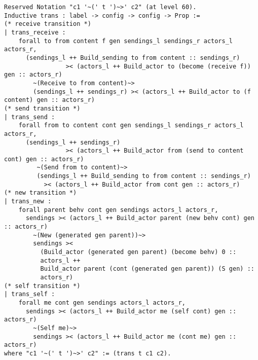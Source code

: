 \begin{lstlisting}
Reserved Notation "c1 '~(' t ')~>' c2" (at level 60).
Inductive trans : label -> config -> config -> Prop :=
(* receive transition *)
| trans_receive :
    forall to from content f gen sendings_l sendings_r actors_l actors_r,
      (sendings_l ++ Build_sending to from content :: sendings_r)
                 >< (actors_l ++ Build_actor to (become (receive f)) gen :: actors_r)
        ~(Receive to from content)~>
        (sendings_l ++ sendings_r) >< (actors_l ++ Build_actor to (f content) gen :: actors_r)
(* send transition *)
| trans_send :
    forall from to content cont gen sendings_l sendings_r actors_l actors_r,
      (sendings_l ++ sendings_r)
                 >< (actors_l ++ Build_actor from (send to content cont) gen :: actors_r)
         ~(Send from to content)~>
         (sendings_l ++ Build_sending to from content :: sendings_r)
           >< (actors_l ++ Build_actor from cont gen :: actors_r)
(* new transition *)
| trans_new :
    forall parent behv cont gen sendings actors_l actors_r,
      sendings >< (actors_l ++ Build_actor parent (new behv cont) gen :: actors_r)
        ~(New (generated gen parent))~>
        sendings ><
          (Build_actor (generated gen parent) (become behv) 0 ::
          actors_l ++
          Build_actor parent (cont (generated gen parent)) (S gen) ::
          actors_r)
(* self transition *)
| trans_self :
    forall me cont gen sendings actors_l actors_r,
      sendings >< (actors_l ++ Build_actor me (self cont) gen :: actors_r)
        ~(Self me)~>
        sendings >< (actors_l ++ Build_actor me (cont me) gen :: actors_r)
where "c1 '~(' t ')~>' c2" := (trans t c1 c2).
\end{lstlisting}
